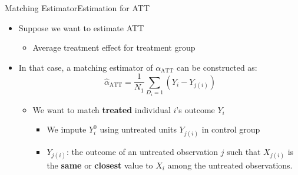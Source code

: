 \documentclass[hyperref={pdfpagelabels=false}]{beamer}
\begin{document}
\begin{frame}{Matching Estimator}{Estimation for ATT}
	\begin{itemize}

		
		\item Suppose we want to estimate ATT
		\vspace{0.3cm}
			\begin{itemize}
			\item Average treatment effect for treatment group
					\vspace{0.3cm}
		\end{itemize}
		\item In that case, a matching estimator of $\alpha_{\text{ATT}}$ can be constructed as:
		\begin{equation*}
		\hat{\alpha}_{\text{ATT}}=\dfrac{1}{N_1}\sum_{D_i=1}(Y_i-Y_{j(i)})
		\end{equation*}
		
			\begin{itemize}
			\item We want to match \textbf{treated} individual $i$'s outcome $Y_i$
		\vspace{0.3cm}
					\begin{itemize}
		\item We impute $Y^{0}_{i}$ using untreated units $Y_{j(i)}$ in control group
				\vspace{0.3cm}
		\item $Y_{j(i)}$: the outcome of an untreated observation $j$ such that $X_{j(i)}$ is the \textbf{same} or \textbf{closest} value to $X_i$ among the untreated observations. 
					\end{itemize}
			\end{itemize}
		
	\end{itemize}
\end{frame}
\end{document}
